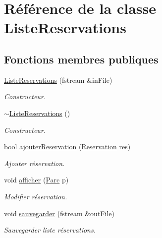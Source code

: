 \hypertarget{class_liste_reservations}{
\section{Référence de la classe ListeReservations}
\label{class_liste_reservations}
}
\subsection*{Fonctions membres publiques}
\begin{DoxyCompactItemize}
\item 
\hyperlink{class_liste_reservations_a588814a2a1a844ad70e790d1cf7f3d45}{ListeReservations} (fstream \&inFile)
\begin{DoxyCompactList}\small\item\em Constructeur. \item\end{DoxyCompactList}\item 
\hyperlink{class_liste_reservations_a32f73522c4b7e1dc98dc6ed8a06e7ec6}{$\sim$ListeReservations} ()
\begin{DoxyCompactList}\small\item\em Constructeur. \item\end{DoxyCompactList}\item 
bool \hyperlink{class_liste_reservations_abc616def701c55e0643f7ace4e0dd0c5}{ajouterReservation} (\hyperlink{class_reservation}{Reservation} res)
\begin{DoxyCompactList}\small\item\em Ajouter réservation. \item\end{DoxyCompactList}\item 
void \hyperlink{class_liste_reservations_a6a199865ea417f472c46cd981bdb9e2c}{afficher} (\hyperlink{class_parc}{Parc} p)
\begin{DoxyCompactList}\small\item\em Modifier réservation. \item\end{DoxyCompactList}\item 
void \hyperlink{class_liste_reservations_a360b471263f043a38feca49f137f7993}{sauvegarder} (fstream \&outFile)
\begin{DoxyCompactList}\small\item\em Sauvegarder liste réservations. \item\end{DoxyCompactList}\end{DoxyCompactItemize}


